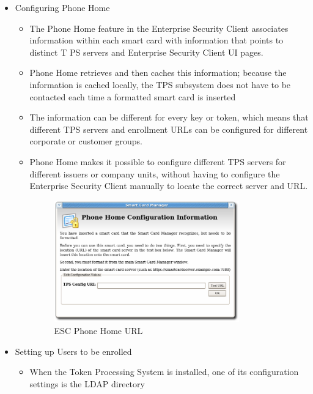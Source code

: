 \documentclass[12pt]{report}
\begin{document}
\begin{itemize}
             \begin{itemize}
                \item  {Configuring Phone Home}
                    \begin{itemize}
                        \item The Phone Home feature in the Enterprise Security Client associates information within each smart card
                            with information that points to distinct T PS servers and Enterprise Security Client UI pages.
                        \item  Phone Home retrieves and then caches this information; because the information is cached locally,
                            the TPS subsystem does not have to be contacted each time a formatted smart card is inserted
                        \item The information can be different for every key or token, which means that different TPS servers and
                             enrollment URLs can be configured for different corporate or customer groups.
                        \item Phone Home makes it possible to configure different TPS servers for different issuers or company units,
                             without having to configure the Enterprise Security Client manually to locate the correct server and URL.
                             \begin{figure}[H]
                                 \centering
                                 \includegraphics[width=80mm]{Images/phonehomeurl.png}
                                 \caption{ESC Phone Home URL ~\cite{RedHat:smartcard}}
                             \end{figure}
                    \end{itemize}
                 \item {Setting up Users to be enrolled}
                     \begin{itemize}
                        \item When the Token Processing System is installed, one of its configuration settings is the LDAP directory

\end{itemize}
\end{itemize}
\end{itemize}
\end{document}
